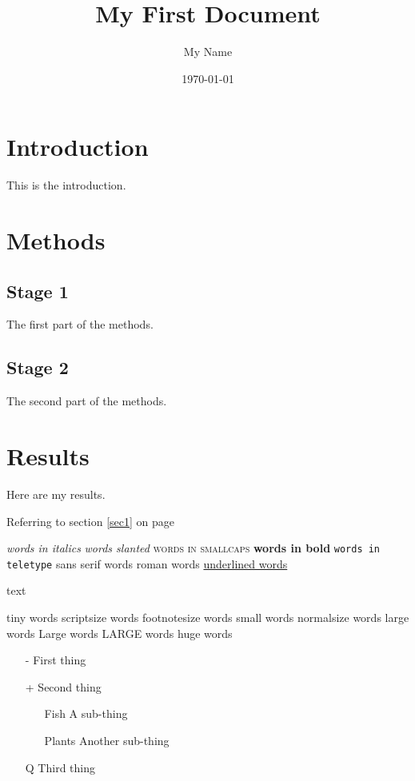\documentclass[a4paper,12pt]{article}
\begin{document}
\title{My First Document}
\author{My Name}
\date{\today}
\maketitle

\section{Introduction}
This is the introduction.
\section{Methods}
\subsection{Stage 1}
The first part of the methods.
\subsection{Stage 2}
The second part of the methods.
\section{Results}
Here are my results.

Referring to section \ref{sec1} on page \pageref{sec1}

\tableofcontents
\newpage
{}

\textit{words in italics}
\textsl{words slanted}
\textsc{words in smallcaps}
\textbf{words in bold}
\texttt{words in teletype}
\textsf{sans serif words}
\textrm{roman words}
\underline{underlined words}

{\color{colour_name}text}

{\tiny tiny words}
{\scriptsize scriptsize words}
{\footnotesize footnotesize words}
{\small small words}
{\normalsize normalsize words}
{\large large words}
{\Large Large words}
{\LARGE LARGE words}
{\huge huge words}

\begin{itemize}
\item[-] First thing
\item[+] Second thing
\begin{itemize}
\item[Fish] A sub-thing
\item[Plants] Another sub-thing
\end{itemize}
\item[Q] Third thing
\end{itemize}
\end{document}
